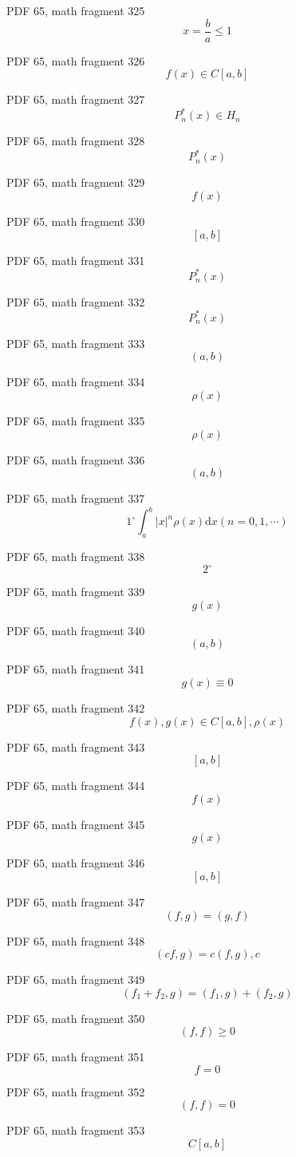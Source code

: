 \documentclass[UTF8,fontset=fandol]{ctexart}
\begin{document}
\par
PDF 65, math fragment 325
\[x = \frac{b}{a} \leqslant 1\]
\par
PDF 65, math fragment 326
\[f(x) \in C[a,b]\]
\par
PDF 65, math fragment 327
\[P_n^*(x) \in H_n\]
\par
PDF 65, math fragment 328
\[P_n^*(x)\]
\par
PDF 65, math fragment 329
\[f(x)\]
\par
PDF 65, math fragment 330
\[[a,b]\]
\par
PDF 65, math fragment 331
\[P_n^*(x)\]
\par
PDF 65, math fragment 332
\[P_n^*(x)\]
\par
PDF 65, math fragment 333
\[(a,b)\]
\par
PDF 65, math fragment 334
\[\rho(x)\]
\par
PDF 65, math fragment 335
\[\rho(x)\]
\par
PDF 65, math fragment 336
\[(a,b)\]
\par
PDF 65, math fragment 337
\[1^\circ \int_a^b |x|^n \rho(x) \mathrm{d}x (n = 0,1,\cdots)\]
\par
PDF 65, math fragment 338
\[2^\circ\]
\par
PDF 65, math fragment 339
\[g(x)\]
\par
PDF 65, math fragment 340
\[(a,b)\]
\par
PDF 65, math fragment 341
\[g(x) \equiv 0\]
\par
PDF 65, math fragment 342
\[f(x), g(x) \in C[a,b], \rho(x)\]
\par
PDF 65, math fragment 343
\[[a,b]\]
\par
PDF 65, math fragment 344
\[f(x)\]
\par
PDF 65, math fragment 345
\[g(x)\]
\par
PDF 65, math fragment 346
\[[a,b]\]
\par
PDF 65, math fragment 347
\[(f,g) = (g,f)\]
\par
PDF 65, math fragment 348
\[(cf,g) = c(f,g), c\]
\par
PDF 65, math fragment 349
\[(f_1 + f_2, g) = (f_1, g) + (f_2, g)\]
\par
PDF 65, math fragment 350
\[(f,f) \geqslant 0\]
\par
PDF 65, math fragment 351
\[f=0\]
\par
PDF 65, math fragment 352
\[(f,f)=0\]
\par
PDF 65, math fragment 353
\[C[a,b]\]
\par
\end{document}
